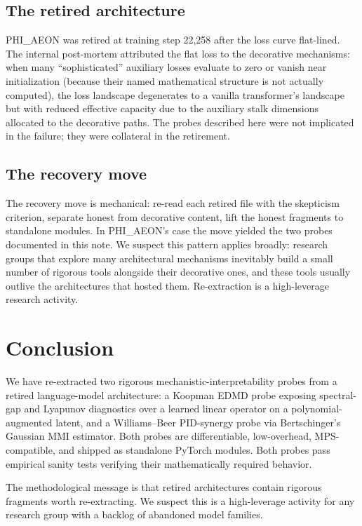 \documentclass[11pt]{article}
\begin{document}
\subsection{The retired architecture}

PHI\_AEON was retired at training step 22{,}258 after the loss curve
flat-lined. The internal post-mortem attributed the flat loss to the
decorative mechanisms: when many ``sophisticated'' auxiliary losses
evaluate to zero or vanish near initialization (because their named
mathematical structure is not actually computed), the loss landscape
degenerates to a vanilla transformer's landscape but with reduced
effective capacity due to the auxiliary stalk dimensions allocated to
the decorative paths. The probes described here were not implicated in
the failure; they were collateral in the retirement.

\subsection{The recovery move}

The recovery move is mechanical: re-read each retired file with the
skepticism criterion, separate honest from decorative content, lift the
honest fragments to standalone modules. In PHI\_AEON's case the move
yielded the two probes documented in this note. We suspect this pattern
applies broadly: research groups that explore many architectural
mechanisms inevitably build a small number of rigorous tools alongside
their decorative ones, and these tools usually outlive the architectures
that hosted them. Re-extraction is a high-leverage research activity.

\section{Conclusion}

We have re-extracted two rigorous mechanistic-interpretability probes
from a retired language-model architecture: a Koopman EDMD probe
exposing spectral-gap and Lyapunov diagnostics over a learned linear
operator on a polynomial-augmented latent, and a Williams--Beer
PID-synergy probe via Bertschinger's Gaussian MMI estimator. Both probes
are differentiable, low-overhead, MPS-compatible, and shipped as
standalone PyTorch modules. Both probes pass empirical sanity tests
verifying their mathematically required behavior.

The methodological message is that retired architectures contain
rigorous fragments worth re-extracting. We suspect this is a high-leverage
activity for any research group with a backlog of abandoned model
families.
\end{document}
